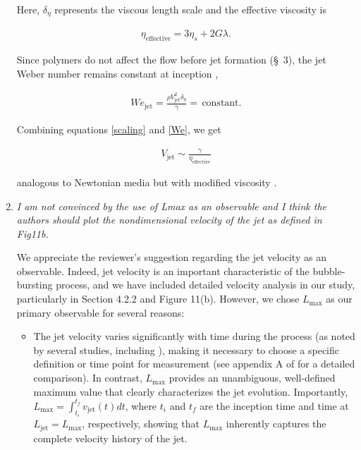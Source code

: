 \documentclass[]{article}
\newcommand{\oo}{\color{magenta} \normalfont}
\newcommand{\bb}{\color{black} \normalfont}
\begin{document}
\begin{enumerate}
	\noindent Here, $\delta_\eta$ represents the viscous length scale and the effective viscosity is

	\begin{align}
		\label{eqn:etaEff}
		\eta_{\text{effective}} = 3\eta_s + 2G\lambda .
	\end{align}

	\noindent \oo Since polymers do not affect the flow before jet formation (\S~3), the jet Weber number remains constant at inception \citep{blanco2021jets},\bb

	\begin{align}
		We_{\text{jet}} = \frac{\rho V_{\text{jet}}^2 \delta_\eta}{\gamma} =\,\text{constant}.
		\label{We}
	\end{align}

	\noindent Combining equations \eqref{scaling} and \eqref{We}, we get

	\begin{align}
		V_{\text{jet}}  \sim \frac{\gamma}{\eta_{\text{effective}}}
		\label{velocityscale}
	\end{align}

	\noindent \oo analogous to Newtonian media but with modified viscosity \citep{gordillo2019capillary, blanco2020sea}.\bb


    \item \textit{I am not convinced by the use of Lmax as an observable and I think the authors should plot the nondimensional velocity of the jet as defined in Fig11b.}

    We appreciate the reviewer's suggestion regarding the jet velocity as an observable. Indeed, jet velocity is an important characteristic of the bubble-bursting process, and we have included detailed velocity analysis in our study, particularly in Section 4.2.2 and Figure 11(b). However, we chose $L_{\text{max}}$ as our primary observable for several reasons:

    \begin{itemize}
    	\item The jet velocity varies significantly with time during the process (as noted by several studies, including \citet{deike2018dynamics,gordillo2019capillary}), making it necessary to choose a specific definition or time point for measurement (see appendix A of \citet{sanjay2021bursting} for a detailed comparison). In contrast, $L_{\text{max}}$ provides an unambiguous, well-defined maximum value that clearly characterizes the jet evolution. Importantly, $L_{\text{max}} = \int_{t_i}^{t_f}v_{\text{jet}}(t)dt$, where $t_i$ and $t_f$ are the inception time and time at $L_{\text{jet}} = L_{\text{max}}$, respectively, showing that $L_{\text{max}}$ inherently captures the complete velocity history of the jet.


\end{itemize}
\end{enumerate}
\end{document}
